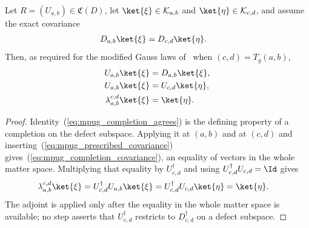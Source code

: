 \begin{lemma}
    \label{thm:mpug_completion_transport}
    \leanok
    Let $R=(U_{a,b})\in\mathfrak C(D)$, let
    $\ket{\xi}\in\mathcal K_{a,b}$ and $\ket{\eta}\in\mathcal K_{c,d}$, and
    assume the exact covariance
    \begin{align}
        D_{a,b}\ket{\xi} & =D_{c,d}\ket{\eta}.
        \label{eq:mpug_prescribed_covariance}
    \end{align}
    Then, as required for the modified Gauss laws
    of~\cite[lines~4325--4335]{FrancoRubio2025MPUGauging} when $(c,d)=T_g(a,b)$,
    \begin{align}
        U_{a,b}\ket{\xi}             & =D_{a,b}\ket{\xi},
        \label{eq:mpug_completion_agrees}                  \\
        U_{a,b}\ket{\xi}             & =U_{c,d}\ket{\eta},
        \label{eq:mpug_completion_covariance}              \\
        \lambda_{a,b}^{c,d}\ket{\xi} & =\ket{\eta}.
        \label{eq:mpug_completion_transport}
    \end{align}
\end{lemma}

\begin{proof}\leanok
    Identity~(\ref{eq:mpug_completion_agrees}) is the defining property of a
    completion on the defect subspace. Applying it at $(a,b)$ and at $(c,d)$
    and inserting~(\ref{eq:mpug_prescribed_covariance})
    gives~(\ref{eq:mpug_completion_covariance}), an equality of vectors in the
    whole matter space. Multiplying that equality by $U_{c,d}^\dagger$ and
    using $U_{c,d}^\dagger U_{c,d}=\Id$ gives
    \begin{align}
        \lambda_{a,b}^{c,d}\ket{\xi}
         & =U_{c,d}^\dagger U_{a,b}\ket{\xi}
        =U_{c,d}^\dagger U_{c,d}\ket{\eta}
        =\ket{\eta}.
    \end{align}
    The adjoint is applied only after the equality in the whole matter space
    is available; no step asserts that $U_{c,d}^\dagger$ restricts to
    $D_{c,d}^\dagger$ on a defect subspace.
\end{proof}

